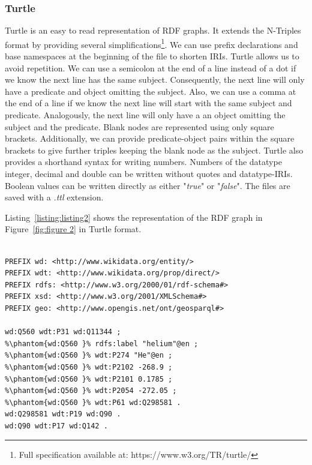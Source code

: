 \documentclass[12 pt, a4paper]{report}
\theoremstyle{definition}
\begin{document}
\subsubsection{Turtle}
Turtle is an easy to read representation of RDF graphs. It extends the N-Triples format by providing several simplifications\footnote{Full specification available at: https://www.w3.org/TR/turtle/}. We can use prefix declarations and base namespaces at the beginning of the file to shorten IRIs. Turtle allows us to avoid repetition. We can use a semicolon at the end of a line instead of a dot if we know the next line has the same subject. Consequently, the next line will only have a predicate and object omitting the subject. Also, we can use a comma at the end of a line if we know the next line will start with the same subject and predicate. Analogously, the next line will only have a an object omitting the subject and the predicate. Blank nodes are represented using only square brackets. Additionally, we can provide predicate-object pairs within the square brackets to give further triples keeping the blank node as the subject. Turtle also provides a shorthand syntax for writing numbers. Numbers of the datatype integer, decimal and double can be written without quotes and datatype-IRIs. Boolean values can be written directly as either "\textit{true}" or "\textit{false}". The files are saved with a \textit{.ttl} extension.

Listing~\ref{listing:listing2} shows the representation of the RDF graph in Figure~\ref{fig:figure 2} in Turtle format. 

\begin{minipage}{\linewidth}
\begin{lstlisting}[label=listing:listing2, caption={RDF graph represented in Turtle syntax}]

PREFIX wd: <http://www.wikidata.org/entity/>
PREFIX wdt: <http://www.wikidata.org/prop/direct/>
PREFIX rdfs: <http://www.w3.org/2000/01/rdf-schema#>
PREFIX xsd: <http://www.w3.org/2001/XMLSchema#>
PREFIX geo: <http://www.opengis.net/ont/geosparql#>

wd:Q560 wdt:P31 wd:Q11344 ;
%\phantom{wd:Q560 }% rdfs:label "helium"@en ;
%\phantom{wd:Q560 }% wdt:P274 "He"@en ;
%\phantom{wd:Q560 }% wdt:P2102 -268.9 ;
%\phantom{wd:Q560 }% wdt:P2101 0.1785 ;
%\phantom{wd:Q560 }% wdt:P2054 -272.05 ;
%\phantom{wd:Q560 }% wdt:P61 wd:Q298581 .
wd:Q298581 wdt:P19 wd:Q90 .
wd:Q90 wdt:P17 wd:Q142 .

\end{lstlisting}
\end{minipage}
\end{document}
